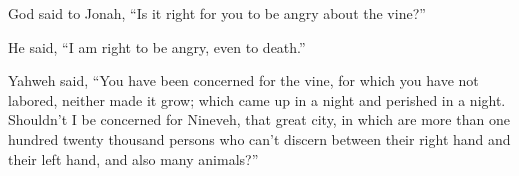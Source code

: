  God said to Jonah, ``Is it right for you to be angry about
the vine?''

He said, ``I am right to be angry, even to death.''

 Yahweh said, ``You have been concerned for the vine, for
which you have not labored, neither made it grow; which came up in a
night and perished in a night.  Shouldn't I be concerned
for Nineveh, that great city, in which are more than one hundred twenty
thousand persons who can't discern between their right hand and their
left hand, and also many animals?''

